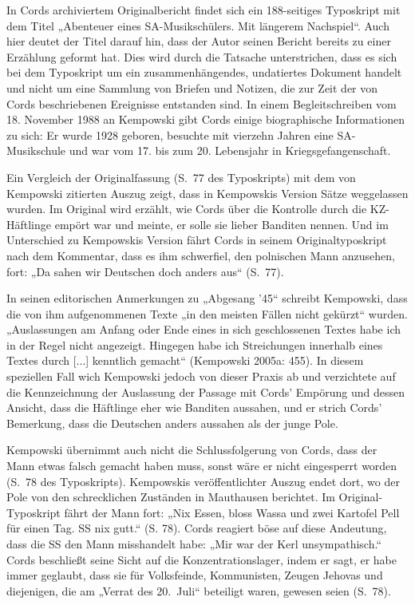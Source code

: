 \begin{multicols*}{2}
In Cords archiviertem Originalbericht findet sich ein 188-seitiges Typoskript mit dem Titel „Abenteuer eines SA-Musikschülers. Mit längerem Nachspiel“. Auch hier deutet der Titel darauf hin, dass der Autor seinen Bericht bereits zu einer Erzählung geformt hat. Dies wird durch die Tatsache unterstrichen, dass es sich bei dem Typoskript um ein zusammenhängendes, undatiertes Dokument handelt und nicht um eine Sammlung von Briefen und Notizen, die zur Zeit der von Cords beschriebenen Ereignisse entstanden sind. In einem Begleitschreiben vom 18. November 1988 an Kempowski gibt Cords einige biographische Informationen zu sich: Er wurde 1928 geboren, besuchte mit vierzehn Jahren eine SA-Musikschule und war vom 17. bis zum 20. Lebensjahr in Kriegsgefangenschaft.

Ein Vergleich der Originalfassung (S. 77 des Typoskripts) mit dem von Kempowski zitierten Auszug zeigt, dass in Kempowskis Version Sätze weggelassen wurden. Im Original wird erzählt, wie Cords über die Kontrolle durch die KZ-Häftlinge empört war und meinte, er solle sie lieber Banditen nennen. Und im Unterschied zu Kempowskis Version fährt Cords in seinem Originaltyposkript nach dem Kommentar, dass es ihm schwerfiel, den polnischen Mann anzusehen, fort: „Da sahen wir Deutschen doch anders aus“ (S. 77).

In seinen editorischen Anmerkungen zu „Abgesang ’45“ schreibt Kempowski, dass die von ihm aufgenommenen Texte „in den meisten Fällen nicht gekürzt“ wurden. „Auslassungen am Anfang oder Ende eines in sich geschlossenen Textes habe ich in der Regel nicht angezeigt. Hingegen habe ich Streichungen innerhalb eines Textes durch [...] kenntlich gemacht“ (Kempowski 2005a: 455). In diesem speziellen Fall wich Kempowski jedoch von dieser Praxis ab und verzichtete auf die Kennzeichnung der Auslassung der Passage mit Cords’ Empörung und dessen Ansicht, dass die Häftlinge eher wie Banditen aussahen, und er strich Cords’ Bemerkung, dass die Deutschen anders aussahen als der junge Pole.

Kempowski übernimmt auch nicht die Schlussfolgerung von Cords, dass der Mann etwas falsch gemacht haben muss, sonst wäre er nicht eingesperrt worden (S. 78 des Typoskripts). Kempowskis veröffentlichter Auszug endet dort, wo der Pole von den schrecklichen Zuständen in Mauthausen berichtet. Im Original-Typoskript fährt der Mann fort: „Nix Essen, bloss Wassa und zwei Kartofel Pell für einen Tag. SS nix gutt.“ (S. 78). Cords reagiert böse auf diese Andeutung, dass die SS den Mann misshandelt habe: „Mir war der Kerl unsympathisch.“ Cords beschließt seine Sicht auf die Konzentrationslager, indem er sagt, er habe immer geglaubt, dass sie für Volksfeinde, Kommunisten, Zeugen Jehovas und diejenigen, die am „Verrat des 20. Juli“ beteiligt waren, gewesen seien (S. 78).


\end{multicols*}

